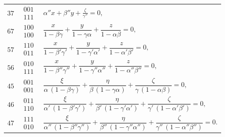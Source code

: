 \documentclass[11pt]{article}
\begin{document}
\begin{center}
\begin{tabular}{c l l}
$37$ & $\begin{smallmatrix}001\\111\end{smallmatrix}$ & $\alpha'' x + \beta'' y + \tfrac{\zeta}{\gamma''} = 0,$\\[3pt]
$67$ & $\begin{smallmatrix}100\\100\end{smallmatrix}$ &
   $\dfrac{x}{1 - \beta\gamma} + \dfrac{y}{1 - \gamma\alpha} + \dfrac{z}{1 - \alpha\beta} = 0,$\\[6pt]
$57$ & $\begin{smallmatrix}110\\011\end{smallmatrix}$ &
   $\dfrac{x}{1 - \beta'\gamma'} + \dfrac{y}{1 - \gamma'\alpha'} + \dfrac{z}{1 - \alpha'\beta'} = 0,$\\[6pt]
$56$ & $\begin{smallmatrix}010\\111\end{smallmatrix}$ &
   $\dfrac{x}{1 - \beta''\gamma''} + \dfrac{y}{1 - \gamma''\alpha''} + \dfrac{z}{1 - \alpha''\beta''} = 0,$\\[6pt]
$45$ & $\begin{smallmatrix}001\\001\end{smallmatrix}$ &
   $\dfrac{\xi}{\alpha\,(1 - \beta\gamma)} + \dfrac{\eta}{\beta\,(1 - \gamma\alpha)}
    + \dfrac{\zeta}{\gamma\,(1 - \alpha\beta)} = 0,$\\[6pt]
$46$ & $\begin{smallmatrix}011\\110\end{smallmatrix}$ &
   $\dfrac{\xi}{\alpha'\,(1 - \beta'\gamma')} + \dfrac{\eta}{\beta'\,(1 - \gamma'\alpha')}
    + \dfrac{\zeta}{\gamma'\,(1 - \alpha'\beta')} = 0,$\\[6pt]
$47$ & $\begin{smallmatrix}111\\010\end{smallmatrix}$ &
   $\dfrac{\xi}{\alpha''\,(1 - \beta''\gamma'')} + \dfrac{\eta}{\beta''\,(1 - \gamma''\alpha'')}
    + \dfrac{\zeta}{\gamma''\,(1 - \alpha''\beta'')} = 0.$\\
\end{tabular}
\end{center}
\end{document}
